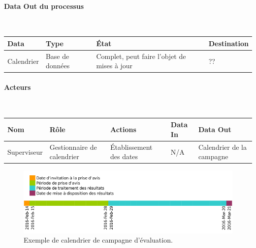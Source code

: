 \documentclass[a4paper,11pt]{report}
\begin{document}

\paragraph{Data Out du processus}~\newline{}

\begin{tabularx}{\linewidth}{|X|X|X|X|} \hline
Data & Type & État & Destination \\ \hline
Calendrier & Base de données & Complet, peut faire l'objet de mises à jour & ?? \\ \hline
\end{tabularx}

\paragraph{Acteurs}~\newline{}

\begin{tabularx}{\linewidth}{|X|X|X|X|X|} \hline
Nom & Rôle & Actions & Data In & Data Out \\ \hline
Superviseur & Gestionnaire de calendrier & Établissement des dates & N/A & Calendrier de la campagne \\ \hline
\end{tabularx}


\begin{figure}[ht]
\includegraphics[width=\linewidth]{timeline_exemple.png}
\caption{Exemple de calendrier de campagne d'évaluation.}
\label{fig:calendrier-exemple}
\end{figure}
\end{document}
